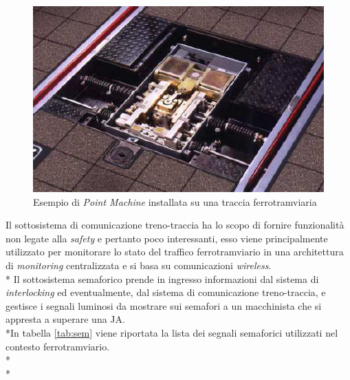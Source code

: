 \begin{itemize}
\begin{figure}[h]
		\centering
		\includegraphics[width=0.7\linewidth]{img/pointmachine}
		\caption{Esempio di \emph{Point Machine} installata su una traccia ferrotramviaria}
		\label{fig:pointmachine}
	\end{figure}
\end{itemize}
Il sottosistema di comunicazione treno-traccia ha lo scopo di fornire funzionalit\`a non legate alla \emph{safety} e pertanto poco interessanti, esso viene principalmente utilizzato per monitorare lo stato del traffico ferrotramviario in una architettura di \emph{monitoring} centralizzata e si basa su comunicazioni \emph{wireless}.\\*
Il sottosistema semaforico prende in ingresso informazioni dal sistema di \emph{interlocking} ed eventualmente, dal sistema di comunicazione treno-traccia, e gestisce i segnali luminosi da mostrare sui semafori a un macchinista che si appresta a superare una JA.\\*In tabella \ref{tab:sem} viene riportata la lista dei segnali semaforici utilizzati nel contesto ferrotramviario.\\*\\*
